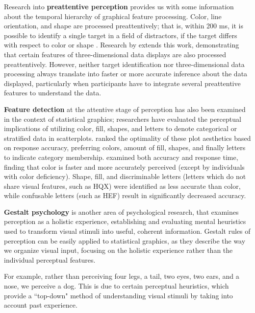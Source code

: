 \documentclass[12pt]{article}\usepackage[]{graphicx}\usepackage[]{color}
\begin{document}
Research into {\bf preattentive perception} provides us with some information about the temporal hierarchy of graphical feature processing. Color, line orientation, and shape are processed preattentively; that is, within 200 ms, it is possible to identify a single target in a field of distractors, if the target differs with respect to color or shape \citep{goldstein2009encyclopedia}. 
Research by \citet{healey1999large} extends this work, demonstrating that certain features of three-dimensional data displays are also processed preattentively. However, neither target identification nor three-dimensional data processing always translate into faster or more accurate inference about the data displayed, particularly when participants have to integrate several preattentive features to understand the data. 

{\bf Feature detection} at the attentive stage of perception has also been examined in the context of statistical graphics; researchers have evaluated the perceptual implications of utilizing color, fill, shapes, and letters to denote categorical or stratified data in scatterplots. \citet{cleveland:1984} ranked the optimality of these plot aesthetics based on response accuracy, preferring colors, amount of fill, shapes, and finally letters to indicate category membership. \citet{lewandowsky1989discriminating} examined both accuracy and response time, finding that color is faster and more accurately perceived (except by individuals with color deficiency). Shape, fill, and discriminable letters (letters which do not share visual features, such as HQX) were identified as less accurate than color, while confusable letters (such as HEF) result in significantly decreased accuracy. 

{\bf Gestalt psychology} is another area of psychological research, that examines perception as a holistic experience, establishing and evaluating mental heuristics used to transform visual stimuli into useful, coherent information. 
Gestalt rules of perception can be easily applied to statistical graphics, as they describe the way we organize visual input, focusing on the holistic experience rather than the individual perceptual features. 

For example, rather than perceiving four legs, a tail, two eyes, two ears, and a nose, we perceive a dog. This is due to certain perceptual heuristics, which provide a ``top-down" method of understanding visual stimuli by taking into account past experience. 
\end{document}
